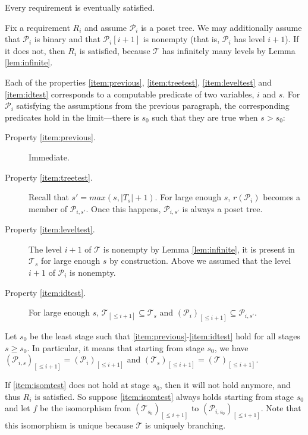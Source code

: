 \documentclass[a4paper,UKenglish,cleveref, autoref, thm-restate]{lipics-v2021}
\begin{document}
 
\begin{lemma}
Every requirement is eventually satisfied.    
\end{lemma}
\begin{claimproof}
    Fix a requirement $R_i$ and assume $\mathcal P_i$ is a poset tree. We may additionally assume that $\mathcal P_i$ is binary and that $\mathcal P_i[i+1]$ is nonempty (that is, $\mathcal P_i$ has level $i+1$). If it does not, then $R_i$ is satisfied, because $\mathcal T$ has infinitely many levels by Lemma \ref{lem:infinite}.

Each of the properties \eqref{item:previous}, \eqref{item:treetest}, \eqref{item:leveltest} and \eqref{item:idtest} corresponds to a computable predicate of two variables, $i$ and $s$. For $\mathcal P_i$ satisfying the assumptions from the previous paragraph, the corresponding predicates hold in the limit---there is $s_0$ such that they are true when $s > s_0$:

\begin{description}
    \item[Property \eqref{item:previous}.] Immediate.
    \item[Property \eqref{item:treetest}.]  Recall that $s' = max(s, |T_s|+1)$. For large enough $s$, $r(\mathcal P_i)$ becomes a member of $\mathcal P_{i,s'}$. Once this happens, $\mathcal P_{i,s'}$ is always a poset tree.
    \item[Property \eqref{item:leveltest}.] The level $i+1$ of $\mathcal T$ is nonempty by Lemma \ref{lem:infinite}, it is present in $\mathcal T_{s}$ for large enough $s$ by construction. Above we assumed that the level $i+1$ of $\mathcal P_i$ is nonempty.
    \item[Property \eqref{item:idtest}.] For large enough $s$, $\mathcal T_{[\leq i +1]} \subseteq \mathcal T_s$ and $(\mathcal P_i)_{[\leq i+1]} \subseteq \mathcal P_{i,s'}$.

\end{description}


    Let $s_0$ be the least stage such that \eqref{item:previous}-\eqref{item:idtest} hold for all stages $s \geq s_0$. In particular, it means that starting from stage $s_0$, we have $(\mathcal P_{i,s})_{[\leq i + 1]}= (\mathcal P_i)_{[\leq i + 1]}$ and $(\mathcal T_{s})_{[\leq i + 1]}= (\mathcal T)_{[\leq i + 1]}$.

    If \eqref{item:isomtest} does not hold at stage $s_0$, then it will not hold anymore, and thus $R_i$ is satisfied. So suppose \eqref{item:isomtest} always holds starting from stage $s_0$ and let $f$ be the isomorphism from $(\mathcal{T}_{s_0})_{[\leq i + 1]}$ to $(\mathcal{P}_{i,s_0})_{[\leq i + 1]}$. Note that this isomorphism is unique because $\mathcal T$ is uniquely branching.
    

\end{claimproof}
\end{document}
